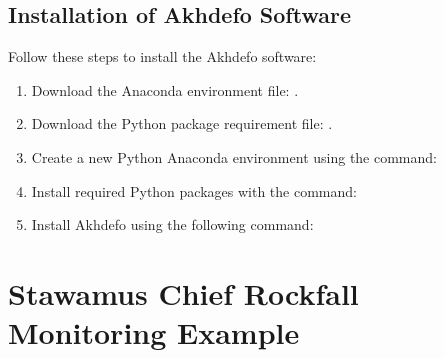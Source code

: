 \documentclass[letterpaper,10pt,english]{sphinxmanual}
\begin{document}
\section{Installation of Akhdefo Software}
\label{\detokenize{README:installation-of-akhdefo-software}}
\sphinxAtStartPar
Follow these steps to install the Akhdefo software:
\begin{enumerate}
%
\item {} 
\sphinxAtStartPar
Download the Anaconda environment file: .

\item {} 
\sphinxAtStartPar
Download the Python package requirement file: .

\item {} 
\sphinxAtStartPar
Create a new Python Anaconda environment using the command:

\begin{sphinxVerbatim}[commandchars=\\\{\}]
    
\end{sphinxVerbatim}

\item {} 
\sphinxAtStartPar
Install required Python packages with the command:

\begin{sphinxVerbatim}[commandchars=\\\{\}]
   
\end{sphinxVerbatim}

\item {} 
\sphinxAtStartPar
Install Akhdefo using the following command:

\begin{sphinxVerbatim}[commandchars=\\\{\}]
  
\end{sphinxVerbatim}

\end{enumerate}

\sphinxstepscope


\chapter{Stawamus Chief Rockfall Monitoring Example}
\label{\detokenize{Stawamus_Chief:stawamus-chief-rockfall-monitoring-example}}\label{\detokenize{Stawamus_Chief::doc}}
\end{document}
